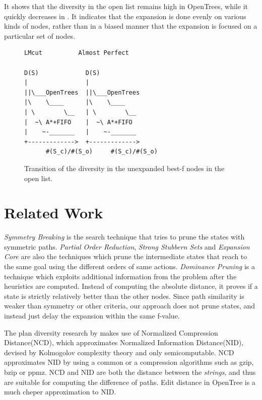 It shows that the diversity in the open list remains high in OpenTrees, while it quickly decreases in \astar. It indicates that the expansion is done evenly on various kinds of nodes, rather than in a biased manner that the expansion is focused on a particular set of nodes.

\begin{figure}[htbp]
\begin{verbatim}
LMcut          Almost Perfect       

D(S)             D(S)                             
|                |             
||\___OpenTrees  ||\___OpenTrees
|\    \____      |\    \____   
| \        \__   | \        \__
|  ~\ A*+FIFO    |  ~\ A*+FIFO 
|    ~-_______   |    ~-_______
+------------->  +------------->
      #(S_c)/#(S_o)     #(S_c)/#(S_o)
\end{verbatim}
\caption{Transition of the diversity in the unexpanded best-f nodes in the open list.}
\label{diversity-transition}
\end{figure}

\section{Related Work}
\label{sec-4}

\emph{Symmetry Breaking} \cite{Fox1998,pochter2011exploiting,domshlak2013symmetry} is the search technique that tries to prune the states with symmetric paths. \emph{Partial Order Reduction}, \emph{Strong Stubbern Sets} and \emph{Expansion Core} are also the techniques which prune the intermediate states that reach to the same goal using the different orders of same actions. \emph{Dominance Pruning} \cite{erol1994} is a technique which exploits additional information from the problem after the heuristics are computed. Instead of computing the absolute distance, it  proves if a state is strictly relatively better than the other nodes. Since path similarity is weaker than symmetry or other criteria, our approach does not prune states, and instead just delay the expansion within the same f-value.

The plan diversity research by \cite{goldman2015measuring} makes use of Normalized Compression Distance(NCD), which approximates Normalized Information Distance(NID), devised by Kolmogolov complexity theory and only semicomputable. NCD approximates NID by using a common or a \sota compression algorithms such as gzip, bzip or ppmz. NCD and NID are both the distance between the  \emph{strings}, and thus are suitable for computing the difference of paths. Edit distance in OpenTree is a much cheper approximation to NID.

